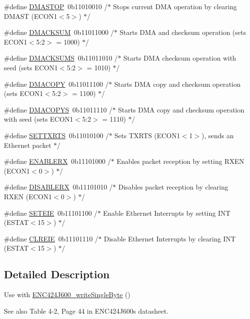 \begin{DoxyCompactItemize}
\item 
\#define \mbox{\hyperlink{group___single_ga6cda58c4a10d34c851230fc3ea7eaf1a}{D\+M\+A\+S\+T\+OP}}~0b11010010 /$\ast$ Stops current D\+M\+A operation by clearing D\+M\+A\+S\+T (\+E\+C\+O\+N1$<$5$>$) $\ast$/
\item 
\#define \mbox{\hyperlink{group___single_ga129e533bb06e3aa1641c9172edb56494}{D\+M\+A\+C\+K\+S\+UM}}~0b11011000 /$\ast$ Starts D\+M\+A and checksum operation (sets E\+C\+O\+N1$<$5\+:2$>$ = 1000) $\ast$/
\item 
\#define \mbox{\hyperlink{group___single_ga4c98f8a75ecaf7988fd864f65ee89c00}{D\+M\+A\+C\+K\+S\+U\+MS}}~0b11011010 /$\ast$ Starts D\+M\+A checksum operation with seed (sets E\+C\+O\+N1$<$5\+:2$>$ = 1010) $\ast$/
\item 
\#define \mbox{\hyperlink{group___single_ga907bfb223f682a2f91b6007155a0adac}{D\+M\+A\+C\+O\+PY}}~0b11011100 /$\ast$ Starts D\+M\+A copy and checksum operation (sets E\+C\+O\+N1$<$5\+:2$>$ = 1100) $\ast$/
\item 
\#define \mbox{\hyperlink{group___single_ga05a3e15f88f8e268907b2ec12420433a}{D\+M\+A\+C\+O\+P\+YS}}~0b11011110 /$\ast$ Starts D\+M\+A copy and checksum operation with seed (sets E\+C\+O\+N1$<$5\+:2$>$ = 1110) $\ast$/
\item 
\#define \mbox{\hyperlink{group___single_ga889d3bef89093b4c5a113384ed539052}{S\+E\+T\+T\+X\+R\+TS}}~0b11010100 /$\ast$ Sets T\+X\+R\+T\+S (\+E\+C\+O\+N1$<$1$>$), sends an Ethernet packet $\ast$/
\item 
\#define \mbox{\hyperlink{group___single_ga54713734b9ae7ae4e95e8a9e41a2a2cf}{E\+N\+A\+B\+L\+E\+RX}}~0b11101000 /$\ast$ Enables packet reception by setting R\+X\+E\+N (\+E\+C\+O\+N1$<$0$>$) $\ast$/
\item 
\#define \mbox{\hyperlink{group___single_ga71b0c6c4ecdcb0051588c13101e9b282}{D\+I\+S\+A\+B\+L\+E\+RX}}~0b11101010 /$\ast$ Disables packet reception by clearing R\+X\+E\+N (\+E\+C\+O\+N1$<$0$>$) $\ast$/
\item 
\#define \mbox{\hyperlink{group___single_ga18fb24806c923f20700c651f0db72a57}{S\+E\+T\+E\+IE}}~0b11101100 /$\ast$ Enable Ethernet Interrupts by setting I\+N\+T (\+E\+S\+T\+A\+T$<$15$>$) $\ast$/
\item 
\#define \mbox{\hyperlink{group___single_gaefaf2ed14e418c07c6587043c0ecd0f9}{C\+L\+R\+E\+IE}}~0b11101110 /$\ast$ Disable Ethernet Interrupts by clearing I\+N\+T (\+E\+S\+T\+A\+T$<$15$>$) $\ast$/
\end{DoxyCompactItemize}


\subsection{Detailed Description}
Use with \mbox{\hyperlink{group__readwrite_ga1f1a557c3d9bef8fbcc879b9f668a4d0}{E\+N\+C424\+J600\+\_\+write\+Single\+Byte}} () \begin{DoxySeeAlso}{See also}
Table 4-\/2, Page 44 in E\+N\+C424\+J600\textquotesingle{}s datasheet. 
\end{DoxySeeAlso}


